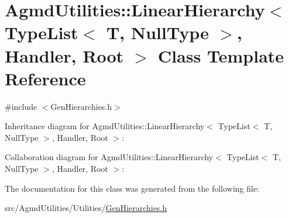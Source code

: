 \hypertarget{class_agmd_utilities_1_1_linear_hierarchy_3_01_type_list_3_01_t_00_01_null_type_01_4_00_01_handler_00_01_root_01_4}{\section{Agmd\+Utilities\+:\+:Linear\+Hierarchy$<$ Type\+List$<$ T, Null\+Type $>$, Handler, Root $>$ Class Template Reference}
\label{class_agmd_utilities_1_1_linear_hierarchy_3_01_type_list_3_01_t_00_01_null_type_01_4_00_01_handler_00_01_root_01_4}
}


{\ttfamily \#include $<$Gen\+Hierarchies.\+h$>$}



Inheritance diagram for Agmd\+Utilities\+:\+:Linear\+Hierarchy$<$ Type\+List$<$ T, Null\+Type $>$, Handler, Root $>$\+:


Collaboration diagram for Agmd\+Utilities\+:\+:Linear\+Hierarchy$<$ Type\+List$<$ T, Null\+Type $>$, Handler, Root $>$\+:


The documentation for this class was generated from the following file\+:\begin{DoxyCompactItemize}
\item 
src/\+Agmd\+Utilities/\+Utilities/\hyperlink{_gen_hierarchies_8h}{Gen\+Hierarchies.\+h}\end{DoxyCompactItemize}
